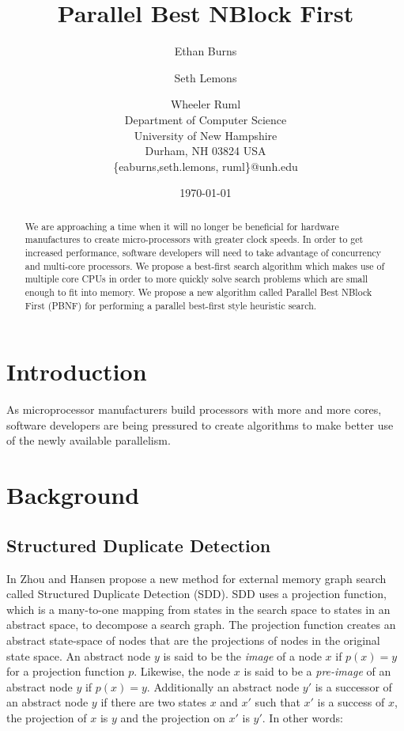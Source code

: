 \documentclass{article}
\title{Parallel Best NBlock First}
\author{Ethan Burns \and Seth Lemons \and Wheeler Ruml \\
Department of Computer Science \\
University of New Hampshire \\
Durham, NH 03824 USA \\
\{eaburns,seth.lemons, ruml\}@unh.edu}
\date{\today}
\begin{document}
\maketitle

\begin{abstract}
We are approaching a time when it will no longer be beneficial for
hardware manufactures to create micro-processors with greater clock
speeds.  In order to get increased performance, software developers
will need to take advantage of concurrency and multi-core processors.
We propose a best-first search algorithm which makes use of multiple
core CPUs in order to more quickly solve search problems which are
small enough to fit into memory.  We propose a new algorithm called
Parallel Best NBlock First (PBNF) for performing a parallel best-first
style heuristic search.
\end{abstract}

\section{Introduction}

As microprocessor manufacturers build processors with more and more
cores, software developers are being pressured to create algorithms to
make better use of the newly available parallelism.

\section{Background}

\subsection{Structured Duplicate Detection}

In \cite{zhou:sdd} Zhou and Hansen propose a new method for external
memory graph search called Structured Duplicate Detection (SDD).  SDD
uses a projection function, which is a many-to-one mapping from states
in the search space to states in an abstract space, to decompose a
search graph.  The projection function creates an abstract state-space
of nodes that are the projections of nodes in the original state
space.  An abstract node $y$ is said to be the \emph{image} of a node
$x$ if $p(x) = y$ for a projection function $p$.  Likewise, the node
$x$ is said to be a \emph{pre-image} of an abstract node $y$ if $p(x)
= y$.  Additionally an abstract node $y'$ is a successor of an
abstract node $y$ if there are two states $x$ and $x'$ such that $x'$
is a success of $x$, the projection of $x$ is $y$ and the
projection on $x'$ is $y'$.  In other words:
\end{document}
